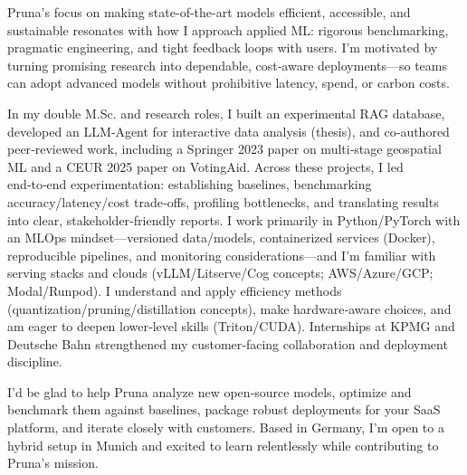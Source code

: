 Pruna’s focus on making state-of-the-art models efficient, accessible, and sustainable resonates with how I approach applied ML: rigorous benchmarking, pragmatic engineering, and tight feedback loops with users. I’m motivated by turning promising research into dependable, cost‑aware deployments—so teams can adopt advanced models without prohibitive latency, spend, or carbon costs.

In my double M.Sc. and research roles, I built an experimental RAG database, developed an LLM‑Agent for interactive data analysis (thesis), and co‑authored peer‑reviewed work, including a Springer 2023 paper on multi‑stage geospatial ML and a CEUR 2025 paper on VotingAid. Across these projects, I led end‑to‑end experimentation: establishing baselines, benchmarking accuracy/latency/cost trade‑offs, profiling bottlenecks, and translating results into clear, stakeholder‑friendly reports. I work primarily in Python/PyTorch with an MLOps mindset—versioned data/models, containerized services (Docker), reproducible pipelines, and monitoring considerations—and I’m familiar with serving stacks and clouds (vLLM/Litserve/Cog concepts; AWS/Azure/GCP; Modal/Runpod). I understand and apply efficiency methods (quantization/pruning/distillation concepts), make hardware‑aware choices, and am eager to deepen lower‑level skills (Triton/CUDA). Internships at KPMG and Deutsche Bahn strengthened my customer‑facing collaboration and deployment discipline.

I’d be glad to help Pruna analyze new open‑source models, optimize and benchmark them against baselines, package robust deployments for your SaaS platform, and iterate closely with customers. Based in Germany, I’m open to a hybrid setup in Munich and excited to learn relentlessly while contributing to Pruna’s mission.